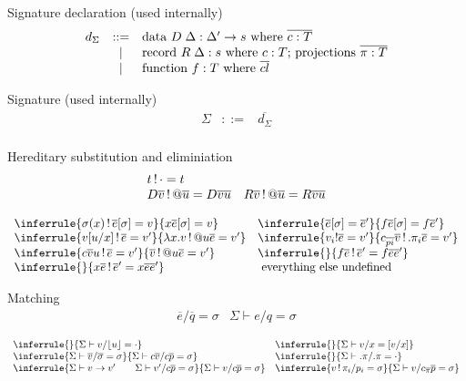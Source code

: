 \documentclass[acmlarge]{acmart}\settopmatter{}
\renewcommand{\|}{\mid}
\begin{document}
Signature declaration (used internally)
\[
\begin{array}{lcl}
d_\Sigma & ::= & \datasig \\
& \| & \recsig \\
& \| & \funsig
\end{array}
\]


Signature (used internally)
\[
\begin{array}{lcl}
\Sigma & ::= &  \overline{d_\Sigma} \\
\end{array}
\]


Hereditary substitution 
and eliminiation 
\[
\begin{array}{lll}
 t \,!\, \cdot = t \\
D \overline{v} \,!\, @ \overline{u} = D \overline{v} \overline{u}
& R \overline{v} \,!\, @ \overline{u} = R \overline{v} \overline{u}
\end{array}
\]

\[
\begin{array}{ll}
\inferrule{\sigma(x) \bang \overline{e}[\sigma] = v}
{x \overline{e}[\sigma] = v}
&
\inferrule{\overline{e}[\sigma] = \overline{e}'}
{f \overline{e}[\sigma] = f \overline{e}'}
\\
\inferrule{ v[u/x] \bang \overline{e} = v'}
{\lambda x.v \bang @u \overline{e} = v'}
&
\inferrule{v_i ! \overline{e} = v'}
{c_{\overline{pi}} \overline{v} \bang .\pi_i \overline{e} = v'}
\\
\inferrule{c \overline{v} u \bang \overline{e} = v'}
{\overline{v} \bang @u \overline{e} = v'}
&
\inferrule{}
{f \overline{e} \bang \overline{e}' = f \overline{e} \overline{e}'}
\\
\inferrule{}
{x \overline{e} \bang \overline{e}' = x \overline{e} \overline{e}'}
&
\text{ everything else undefined }
\end{array}
\]



Matching
\[
\begin{array}{ll}
\overline{e}/\overline{q} = \sigma  &
\Sigma \vdash e/q = \sigma
\end{array}
\]

\[
\begin{array}{ll}
\inferrule{}
{\Sigma \vdash v/\lfloor u \rfloor = \cdot} %
&
\inferrule{}
{\Sigma \vdash v/x = [v/x]} %
\\
\inferrule{\Sigma \vdash \overline{v}/\overline{\sigma} = \sigma}
{\Sigma \vdash c\overline{v}/c\overline{p} = \sigma}  %
&
\inferrule{}
{\Sigma \vdash .\pi/.\pi = \cdot} %
\\
\inferrule{\Sigma \vdash v \to v' \qquad \Sigma \vdash v'/c\overline{p} = \sigma}
{\Sigma \vdash v / c \overline{p} = \sigma} %
&
\inferrule{v \bang \pi_i / p_i = \sigma}
{\Sigma \vdash v / c_{\overline \pi} \overline{p} = \sigma} %
\end{array}
\]
\end{document}

